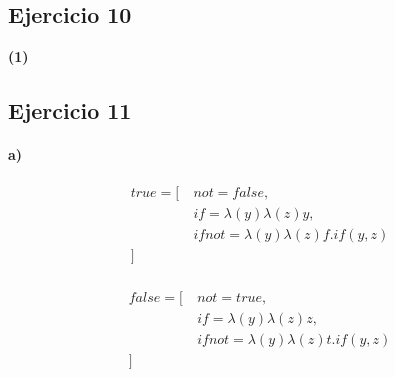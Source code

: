 \documentclass[10pt,a4paper]{article}
\begin{document}
\subsection{Ejercicio 10}
\vspace*{5mm}
	\begin{center}
		\begin{scprooftree}
		\def\extraVskip{5pt}

    
    \RightLabel{[Upd]}
\RightLabel{[Sel]}
		\end{scprooftree}    
	\end{center}
	\vspace{5mm}
	\begin{center}\textbf{(1)}
		\begin{scprooftree}
		\def\extraVskip{5pt}


        \RightLabel{[Upd]}
    \RightLabel{[Sel]}
		\end{scprooftree}    
	\end{center}
\subsection{Ejercicio 11}
\paragraph{a)}
\setlength{\columnsep}{-5cm}
\begin{multicols}{2}
\begin{align*}
true = [~&not = false,  \\
&if = \lambda(y)\lambda(z)y, \\
&ifnot = \lambda(y)\lambda(z)f.if(y,z) \\
]~& \\
\end{align*}

\begin{align*}
false = [~&not = true,  \\
&if = \lambda(y)\lambda(z)z, \\
&ifnot = \lambda(y)\lambda(z)t.if(y,z) \\
]~& \\
\end{align*}
\end{multicols}
\end{document}
